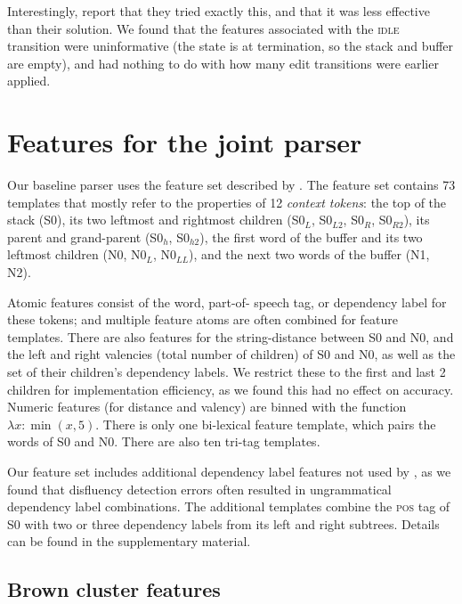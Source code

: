 \documentclass[11pt,letterpaper]{article}
\newcommand{\pos}{\textsc{pos}\xspace}
\newcommand{\szero}{S0\xspace}
\newcommand{\nzero}{N0\xspace}
\newcommand{\szeroH}{S0$_h$\xspace}
\newcommand{\szeroHH}{S0$_{h2}$\xspace}
\newcommand{\szeroL}{S0$_L$\xspace}
\newcommand{\szeroLL}{S0$_{L2}$\xspace}
\newcommand{\szeroR}{S0$_R$\xspace}
\newcommand{\szeroRR}{S0$_{R2}$\xspace}
\newcommand{\nzeroL}{N0$_L$\xspace}
\newcommand{\nzeroLL}{N0$_{LL}$\xspace}
\begin{document}
Interestingly, \citet{zhang:13} report that they tried exactly this, and that it
was less effective than their solution. We found that the features
associated with the \textsc{idle} transition were uninformative (the state is at
termination, so the stack and buffer are empty), and had nothing to do with how
many edit transitions were earlier applied.

\section{Features for the joint parser}
\label{sec:features}

Our baseline parser uses the feature set described by \citet{zhang:11}.
The feature set contains 73 templates that mostly refer to the properties of
12 \emph{context tokens}: the top of the stack (\szero), its two leftmost and
rightmost children (\szeroL, \szeroLL, \szeroR, \szeroRR), its parent and
grand-parent (\szeroH, \szeroHH), the first word of the buffer and its two leftmost
children (\nzero, \nzeroL, \nzeroLL), and the next two words of the buffer (N1, N2).

Atomic features consist of the word, part-of- speech tag, or dependency label
for these tokens; and multiple feature atoms are often combined for feature
templates. There are also features for the string-distance between \szero
and \nzero, and the left and right valencies
(total number of children) of \szero and \nzero, as well as the set of their children's
dependency labels. We restrict these
to the first and last 2 children for implementation efficiency, as we found this
had no effect on accuracy. Numeric features (for distance and valency) are binned
with the function $\lambda x: \min(x, 5)$.
There is only one bi-lexical feature template, which pairs
the words of \szero and \nzero.
There are also ten tri-tag templates.

Our feature set includes additional dependency label features not used by \citet{zhang:11},
as we found that disfluency detection errors often resulted in ungrammatical
dependency label combinations.  The additional templates combine the \pos tag of \szero with
two or three dependency labels from its left and right subtrees.  Details can be found in
the supplementary material.

\subsection{Brown cluster features}
\label{sec:browns}
\end{document}
